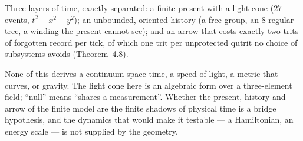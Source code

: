 \begin{keyidea}
Three layers of time, exactly separated: a finite present with a light cone ($27$
events, $t^2-x^2-y^2$); an unbounded, oriented history (a free group, an $8$-regular tree,
a winding the present cannot see); and an arrow that costs exactly two trits of forgotten
record per tick, of which one trit per unprotected qutrit no choice of subsystems avoids (Theorem~4.8).
\end{keyidea}

\begin{boundary}
None of this derives a continuum space-time, a speed of light, a metric that curves, or
gravity. The light cone here is an algebraic form over a three-element field; ``null''
means ``shares a measurement''. Whether the present, history and arrow of the finite model
are the finite shadows of physical time is a bridge hypothesis, and the dynamics that would
make it testable --- a Hamiltonian, an energy scale --- is not supplied by the geometry.
\tierO
\end{boundary}
